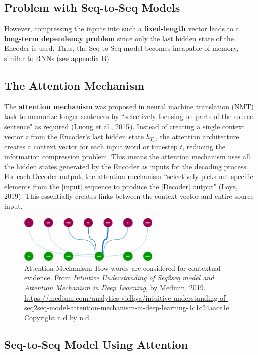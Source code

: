 \subsection{Problem with Seq-to-Seq Models}

However, compressing the inputs into such a \textbf{fixed-length} vector leads to a \textbf{long-term dependency problem} since only the last hidden state of the Encoder is used. Thus, the Seq-to-Seq model becomes incapable of memory, similar to RNNs (see appendix B). 

\subsection{The Attention Mechanism}

The \textbf{attention mechanism} was proposed in neural machine translation (NMT) task to memorize longer sentences by ``selectively focusing on parts of the source sentence" as required (Luong et al., 2015). Instead of creating a single context vector $z$ from the Encoder's last hidden state $h_{T_x}$, the attention architecture creates a context vector for each input word or timestep $t$, reducing the information compression problem. This means the attention mechanism uses all the hidden states generated by the Encoder as inputs for the decoding process. For each Decoder output, the attention mechanism ``selectively picks out specific elements from the [input] sequence to produce the [Decoder] output" (Loye, 2019). This essentially creates links between the context vector and entire source input. 

\begin{figure}[h]
\centering
\includegraphics[width=0.6\textwidth]{imgs/attention.png}
\caption{\footnotesize Attention Mechanism: How words are considered for contextual evidence. From \emph{Intuitive Understanding of Seq2seq model and Attention Mechanism in Deep Learning}, by Medium, 2019. \url{https://medium.com/analytics-vidhya/intuitive-understanding-of-seq2seq-model-attention-mechanism-in-deep-learning-1c1c24aace1e}. Copyright n.d by n.d.}
\end{figure}

\subsection{Seq-to-Seq Model Using Attention}

